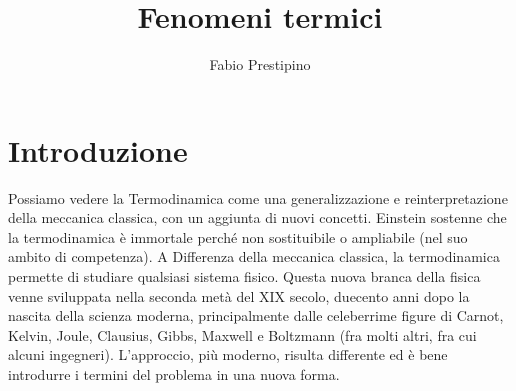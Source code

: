 \documentclass[10pt,a4paper]{article}
\author{Fabio Prestipino}
\title{Fenomeni termici}
\begin{document}
\maketitle

\section{Introduzione}
	Possiamo vedere la Termodinamica come una generalizzazione e reinterpretazione della meccanica classica, con un aggiunta di nuovi concetti. Einstein sostenne che la termodinamica è immortale perché non sostituibile o ampliabile (nel suo ambito di competenza). A Differenza della meccanica classica, la termodinamica permette di studiare qualsiasi sistema fisico. Questa nuova branca della fisica venne sviluppata nella seconda metà del XIX secolo, duecento anni dopo la nascita della scienza moderna, principalmente dalle celeberrime figure di Carnot, Kelvin, Joule, Clausius, Gibbs, Maxwell e Boltzmann (fra molti altri, fra cui alcuni ingegneri). L'approccio, più moderno, risulta differente ed è bene introdurre i termini del problema in una nuova forma.\\
\end{document}
